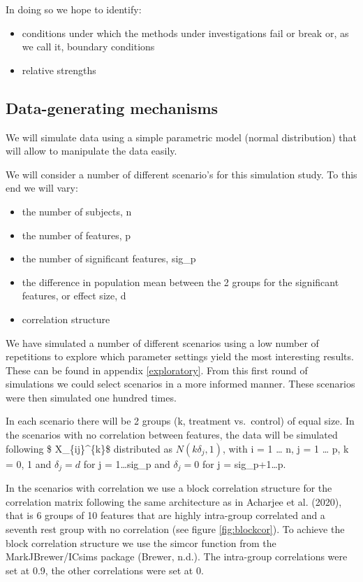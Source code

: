 \documentclass[
]{article}
\begin{document}
In doing so we hope to identify:

\begin{itemize}
\item
  conditions under which the methods under investigations fail or break or, as we call it, boundary conditions
\item
  relative strengths
\end{itemize}

\hypertarget{data-generating-mechanisms}{%
\subsection{Data-generating mechanisms}\label{data-generating-mechanisms}}

We will simulate data using a simple parametric model (normal distribution) that will allow to manipulate the data easily.

We will consider a number of different scenario's for this simulation study. To this end we will vary:

\begin{itemize}
\item
  the number of subjects, n
\item
  the number of features, p
\item
  the number of significant features, sig\_p
\item
  the difference in population mean between the 2 groups for the significant features, or effect size, d
\item
  correlation structure
\end{itemize}

We have simulated a number of different scenarios using a low number of repetitions to explore which parameter settings yield the most interesting results. These can be found in appendix \ref{exploratory}. From this first round of simulations we could select scenarios in a more informed manner. These scenarios were then simulated one hundred times.

In each scenario there will be 2 groups (k, treatment vs.~control) of equal size. In the scenarios with no correlation between features, the data will be simulated following \$ X\_\{ij\}\^{}\{k\}\$ distributed as \(N(k \delta_j, 1)\), with i = 1 \ldots{} n, j = 1 \ldots{} p, k = 0, 1 and \(\delta_j = d\) for j = 1\ldots sig\_p and \(\delta_j = 0\) for j = sig\_p+1\ldots p.~

In the scenarios with correlation we use a block correlation structure for the correlation matrix following the same architecture as in Acharjee et al. (2020), that is 6 groups of 10 features that are highly intra-group correlated and a seventh rest group with no correlation (see figure \ref{fig:blockcor}). To achieve the block correlation structure we use the simcor function from the MarkJBrewer/ICsims package (Brewer, n.d.). The intra-group correlations were set at 0.9, the other correlations were set at 0.
\end{document}
